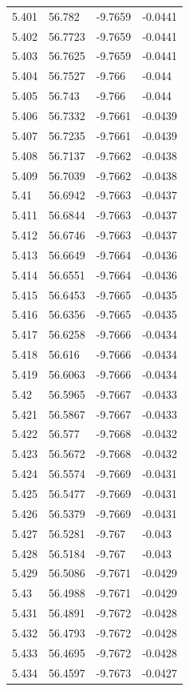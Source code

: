 \begin{tabular}{llll}
5.401 & 56.782 & -9.7659 & -0.0441 \\
5.402 & 56.7723 & -9.7659 & -0.0441 \\
5.403 & 56.7625 & -9.7659 & -0.0441 \\
5.404 & 56.7527 & -9.766 & -0.044 \\
5.405 & 56.743 & -9.766 & -0.044 \\
5.406 & 56.7332 & -9.7661 & -0.0439 \\
5.407 & 56.7235 & -9.7661 & -0.0439 \\
5.408 & 56.7137 & -9.7662 & -0.0438 \\
5.409 & 56.7039 & -9.7662 & -0.0438 \\
5.41 & 56.6942 & -9.7663 & -0.0437 \\
5.411 & 56.6844 & -9.7663 & -0.0437 \\
5.412 & 56.6746 & -9.7663 & -0.0437 \\
5.413 & 56.6649 & -9.7664 & -0.0436 \\
5.414 & 56.6551 & -9.7664 & -0.0436 \\
5.415 & 56.6453 & -9.7665 & -0.0435 \\
5.416 & 56.6356 & -9.7665 & -0.0435 \\
5.417 & 56.6258 & -9.7666 & -0.0434 \\
5.418 & 56.616 & -9.7666 & -0.0434 \\
5.419 & 56.6063 & -9.7666 & -0.0434 \\
5.42 & 56.5965 & -9.7667 & -0.0433 \\
5.421 & 56.5867 & -9.7667 & -0.0433 \\
5.422 & 56.577 & -9.7668 & -0.0432 \\
5.423 & 56.5672 & -9.7668 & -0.0432 \\
5.424 & 56.5574 & -9.7669 & -0.0431 \\
5.425 & 56.5477 & -9.7669 & -0.0431 \\
5.426 & 56.5379 & -9.7669 & -0.0431 \\
5.427 & 56.5281 & -9.767 & -0.043 \\
5.428 & 56.5184 & -9.767 & -0.043 \\
5.429 & 56.5086 & -9.7671 & -0.0429 \\
5.43 & 56.4988 & -9.7671 & -0.0429 \\
5.431 & 56.4891 & -9.7672 & -0.0428 \\
5.432 & 56.4793 & -9.7672 & -0.0428 \\
5.433 & 56.4695 & -9.7672 & -0.0428 \\
5.434 & 56.4597 & -9.7673 & -0.0427 \\

\end{tabular}
